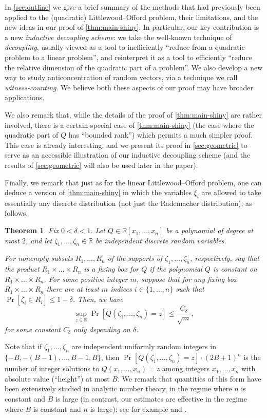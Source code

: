\documentclass[english]{article}
\newtheorem{theorem}{Theorem}[section]
\theoremstyle{remark}
\numberwithin{equation}{section}
\numberwithin{figure}{section}
\newcommand{\RR}{\mathbb{R}}
\begin{document}
In \cref{sec:outline} we give a brief summary of the methods that had previously been applied to the (quadratic) Littlewood–Offord problem, their limitations, and the new ideas in our proof of \cref{thm:main-shiny}. In particular, our key contribution is a new \emph{inductive decoupling scheme}: we take the well-known technique of \emph{decoupling}, usually viewed as a tool to inefficiently ``reduce from a quadratic problem to a linear problem'', and reinterpret it as a tool to efficiently ``reduce the relative dimension of the quadratic part of a problem''.  We also develop a new way to study anticoncentration of random vectors, via a technique we call \emph{witness-counting}. We believe both these aspects of our proof may have broader applications.

We also remark that, while the details of the proof of \cref{thm:main-shiny} are rather involved, there is a certain special case of \cref{thm:main-shiny} (the case where the quadratic part of $Q$ has ``bounded rank'') which permits a much simpler proof. This case is already interesting, and we present its proof in \cref{sec:geometric} to serve as an accessible illustration of our inductive decoupling scheme (and the results of \cref{sec:geometric} will also be used later in the paper).

Finally, we remark that just as for the linear Littlewood--Offord problem, one can deduce a version of \cref{thm:main-shiny} in which the variables $\xi_{i}$ are allowed to take essentially any discrete distribution (not just the Rademacher distribution), as follows.

\begin{theorem}\label{thm:general-distributions}
    Fix $0<\delta<1$. Let $Q\in\RR[x_{1},\dots,x_{n}]$ be a polynomial of degree at most $2$, and let $\zeta_{1},\dots,\zeta_{n}\in \RR$ be independent discrete random variables.

    For nonempty subsets $R_1,\dots,R_n$ of the supports of $\zeta_{1},\dots,\zeta_{n}$, respectively,  say that the product $R_1\times \dots\times R_n$ is a \emph{fixing box} for $Q$ if the polynomial $Q$ is constant on $R_1\times \dots\times R_n$. For some positive integer $m$, suppose that for any fixing box $R_1\times \dots\times R_n$ there are at least $m$ indices $i\in \{1,\dots,n\}$ such that $\Pr[\zeta_{i}\in R_i]\le 1-\delta$. Then, we have
\[
\sup_{z\in\RR}\Pr[Q(\zeta_{1},\dots,\zeta_{n})=z]\le \frac{C_\delta}{\sqrt{m}},
\]
for some constant $C_\delta$ only depending on $\delta$.
\end{theorem}
Note that if $\zeta_1,\dots,\zeta_n$ are independent uniformly random integers in $\{-B,-(B-1),\dots,B-1,B\}$, then $\Pr[Q(\zeta_{1},\dots,\zeta_{n})=z]\cdot (2B+1)^n$ is the number of integer solutions to $Q(x_1,\dots,x_n)=z$ among integers $x_1,\dots,x_n$ with absolute value (``height'') at most $B$. We remark that quantities of this form have been extensively studied in analytic number theory, in the regime where $n$ is constant and $B$ is large (in contrast, our estimates are effective in the regime where $B$ is constant and $n$ is large); see for example \cite{HB02,Pil95} and \cite[Theorem~1.11]{BG17}.
\end{document}
